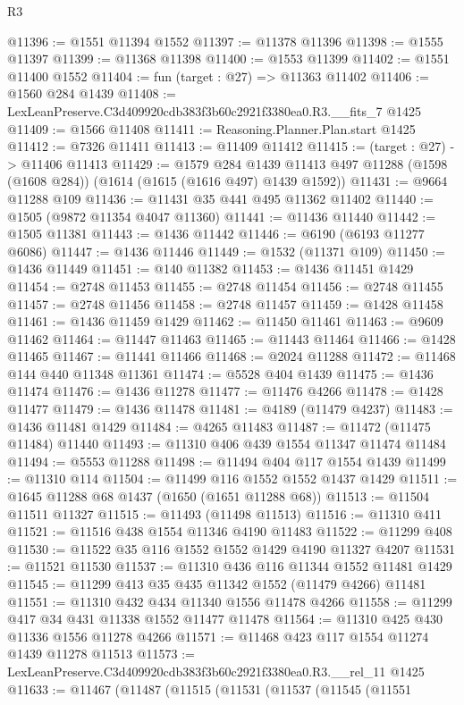 \begin{lexlean}{R3}
\begin{coremodule}
@11396 := @1551 @11394 @1552
@11397 := @11378 @11396
@11398 := @1555 @11397
@11399 := @11368 @11398
@11400 := @1553 @11399
@11402 := @1551 @11400 @1552
@11404 := fun (target : @27) => @11363 @11402
@11406 := @1560 @284 @1439
@11408 := LexLeanPreserve.C3d409920cdb383f3b60c2921f3380ea0.R3.__fits_7 @1425
@11409 := @1566 @11408
@11411 := Reasoning.Planner.Plan.start @1425
@11412 := @7326 @11411
@11413 := @11409 @11412
@11415 := (target : @27) -> @11406 @11413
@11429 := @1579
    @284
    @1439
    @11413
    @497
    @11288
    (@1598 (@1608 @284))
    (@1614 (@1615 (@1616 @497) @1439 @1592))
@11431 := @9664 @11288 @109
@11436 := @11431 @35 @441 @495 @11362 @11402
@11440 := @1505 (@9872 @11354 @4047 @11360)
@11441 := @11436 @11440
@11442 := @1505 @11381
@11443 := @1436 @11442
@11446 := @6190 (@6193 @11277 @6086)
@11447 := @1436 @11446
@11449 := @1532 (@11371 @109)
@11450 := @1436 @11449
@11451 := @140 @11382
@11453 := @1436 @11451 @1429
@11454 := @2748 @11453
@11455 := @2748 @11454
@11456 := @2748 @11455
@11457 := @2748 @11456
@11458 := @2748 @11457
@11459 := @1428 @11458
@11461 := @1436 @11459 @1429
@11462 := @11450 @11461
@11463 := @9609 @11462
@11464 := @11447 @11463
@11465 := @11443 @11464
@11466 := @1428 @11465
@11467 := @11441 @11466
@11468 := @2024 @11288
@11472 := @11468 @144 @440 @11348 @11361
@11474 := @5528 @404 @1439
@11475 := @1436 @11474
@11476 := @1436 @11278
@11477 := @11476 @4266
@11478 := @1428 @11477
@11479 := @1436 @11478
@11481 := @4189 (@11479 @4237)
@11483 := @1436 @11481 @1429
@11484 := @4265 @11483
@11487 := @11472 (@11475 @11484) @11440
@11493 := @11310 @406 @439 @1554 @11347 @11474 @11484
@11494 := @5553 @11288
@11498 := @11494 @404 @117 @1554 @1439
@11499 := @11310 @114
@11504 := @11499 @116 @1552 @1552 @1437 @1429
@11511 := @1645 @11288 @68 @1437 (@1650 (@1651 @11288 @68))
@11513 := @11504 @11511 @11327
@11515 := @11493 (@11498 @11513)
@11516 := @11310 @411
@11521 := @11516 @438 @1554 @11346 @4190 @11483
@11522 := @11299 @408
@11530 := @11522 @35 @116 @1552 @1552 @1429 @4190 @11327 @4207
@11531 := @11521 @11530
@11537 := @11310 @436 @116 @11344 @1552 @11481 @1429
@11545 := @11299 @413 @35 @435 @11342 @1552 (@11479 @4266) @11481
@11551 := @11310 @432 @434 @11340 @1556 @11478 @4266
@11558 := @11299 @417 @34 @431 @11338 @1552 @11477 @11478
@11564 := @11310 @425 @430 @11336 @1556 @11278 @4266
@11571 := @11468 @423 @117 @1554 @11274 @1439 @11278 @11513
@11573 := LexLeanPreserve.C3d409920cdb383f3b60c2921f3380ea0.R3.__rel_11 @1425
@11633 := @11467
    (@11487
      (@11515
        (@11531
          (@11537
            (@11545
              (@11551

\end{coremodule}
\end{lexlean}
